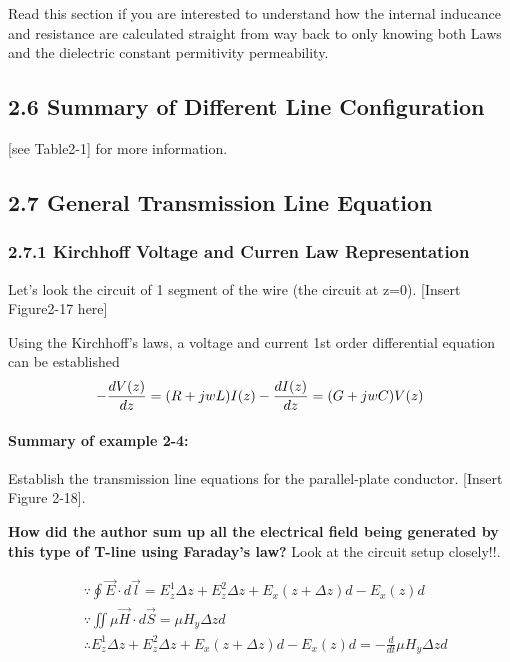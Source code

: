 \documentclass[11pt]{article}
\begin{document}
Read this section if you are interested to understand how the internal
inducance and resistance are calculated straight from way back to only
knowing both Laws and the dielectric constant permitivity permeability.

    \hypertarget{summary-of-different-line-configuration}{%
\subsection{2.6 Summary of Different Line
Configuration}\label{summary-of-different-line-configuration}}

{[}see Table2-1{]} for more information.

    \hypertarget{general-transmission-line-equation}{%
\subsection{2.7 General Transmission Line
Equation}\label{general-transmission-line-equation}}

\hypertarget{kirchhoff-voltage-and-curren-law-representation}{%
\subsubsection{2.7.1 Kirchhoff Voltage and Curren Law
Representation}\label{kirchhoff-voltage-and-curren-law-representation}}

Let's look the circuit of 1 segment of the wire (the circuit at z=0).
{[}Insert Figure2-17 here{]}

    Using the Kirchhoff's laws, a voltage and current 1st order differential
equation can be established \[
-\frac{dV(z)}{dz}=(R+jwL)I(z)\\
-\frac{dI(z)}{dz}=(G+jwC)V(z)
\]

    \hypertarget{summary-of-example-2-4}{%
\paragraph{Summary of example 2-4:}\label{summary-of-example-2-4}}

Establish the transmission line equations for the parallel-plate
conductor. {[}Insert Figure 2-18{]}.

\textbf{How did the author sum up all the electrical field being
generated by this type of T-line using Faraday's law?} Look at the
circuit setup closely!!.

\[\begin{align}
&\because \oint{\vec{E}\cdot d\vec{l}} = E_z^1\Delta z+E_z^2\Delta z+E_x(z+\Delta z)d-E_x(z)d\\
&\because \iint{\mu \vec{H}\cdot d\vec{S}} = \mu H_y\Delta zd\\
&\therefore E_z^1\Delta z+E_z^2\Delta z+E_x(z+\Delta z)d-E_x(z)d = -\frac{d}{dt}\mu H_y\Delta zd
\end{align}\]
\end{document}
